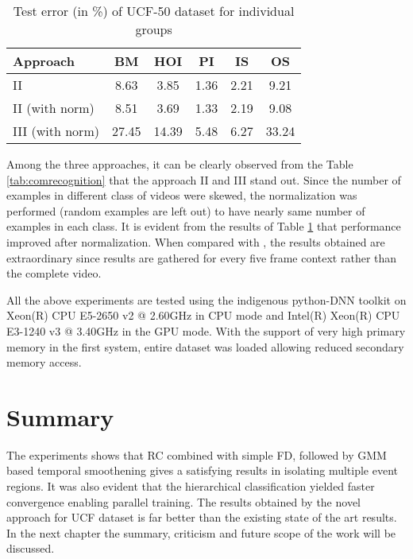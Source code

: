 \begin{table}[htbp]
   \caption{Test error (in \%) of UCF-50 dataset for individual groups}
   \begin{center}
   \begin{tabular}{|l|c|c|c|c|c|} \hline
        \textbf{Approach} & \textbf{BM} & \textbf{HOI} & \textbf{PI} & \textbf{IS} & \textbf{OS} \\ \hline
		II & 8.63 & 3.85 & 1.36 & 2.21 & 9.21 \\ \hline
		II (with norm) & 8.51 & 3.69 & 1.33 & 2.19 & 9.08 \\ \hline		 
		III (with norm) & 27.45 & 14.39 & 5.48 & 6.27 & 33.24 \\ \hline
   \end{tabular}
   \label{tab:indirecognition}
   \medskip \small 
   \end{center}
 \end{table} 
  
Among the three approaches, it can be clearly observed from the Table \ref{tab:comrecognition} that the approach II and III  stand out.  Since the number of examples in different class of videos were skewed, the normalization was performed (random examples are left out) to have nearly same number of examples in each class.  It is evident from the results of Table \ref{tab:indirecognition} that performance improved after normalization. When compared with \citep{recognizing50}, the results obtained are extraordinary since results are gathered for every five frame context rather than the complete video.
\par All the above experiments are tested using the indigenous python-DNN toolkit on  Xeon(R) CPU E5-2650 v2 @ 2.60GHz in CPU mode and Intel(R) Xeon(R) CPU E3-1240 v3 @ 3.40GHz in the GPU mode. With the support of very high primary memory in  the first system, entire dataset was loaded allowing reduced secondary memory access.

\section{Summary}
The experiments shows that RC combined with simple FD,  followed by GMM based temporal smoothening gives a satisfying results in isolating multiple event regions.  It was also evident that the  hierarchical classification yielded  faster convergence enabling parallel training.  The results obtained by the novel approach  for UCF dataset is far better than the existing state of the art results.  In the next chapter the summary, criticism and future scope of the work will be discussed.